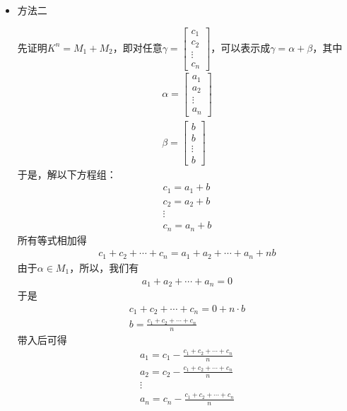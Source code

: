 \documentclass{article}
\begin{document}
\begin{itemize}
  \item 方法二

        先证明$K^n = M_1 + M_2$，即对任意$\gamma  = \begin{bmatrix}
            c_1    \\
            c_2    \\
            \vdots \\
            c_n
          \end{bmatrix}$，可以表示成$\gamma = \alpha + \beta$，其中
        \begin{align*}
          \alpha = \begin{bmatrix}
                     a_1    \\
                     a_2    \\
                     \vdots \\
                     a_n
                   \end{bmatrix} \\
          \beta = \begin{bmatrix}
                    b      \\
                    b      \\
                    \vdots \\
                    b
                  \end{bmatrix}
        \end{align*}
        于是，解以下方程组：
        \begin{align*}
          c_1 = a_1 + b \\
          c_2 = a_2 + b \\
          \vdots        \\
          c_n = a_n + b
        \end{align*}
        所有等式相加得
        \begin{align*}
          c_1 + c_2 + \cdots + c_n = a_1 + a_2 + \cdots + a_n + n b
        \end{align*}
        由于$\alpha \in M_1$，所以，我们有
        \begin{align*}
          a_1 + a_2 + \cdots + a_n = 0
        \end{align*}
        于是
        \begin{align*}
          c_1 + c_2 + \cdots + c_n = 0 + n \cdot b \\
          b = \frac{c_1 + c_2 + \cdots + c_n}{n}
        \end{align*}
        带入后可得
        \begin{align*}
          a_1 = c_1 - \frac{c_1 + c_2 + \cdots + c_n}{n} \\
          a_2 = c_2 - \frac{c_1 + c_2 + \cdots + c_n}{n} \\
          \vdots                                         \\
          a_n = c_n - \frac{c_1 + c_2 + \cdots + c_n}{n}
        \end{align*}


\end{itemize}
\end{document}
